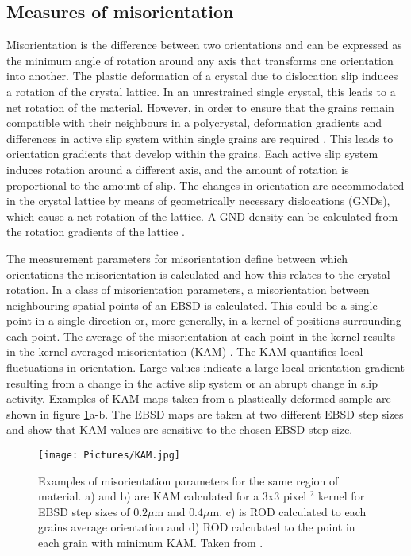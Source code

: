 \subsection{Measures of misorientation}
\label{Measures of misorientation}

Misorientation is the difference between two orientations and can be expressed as the minimum angle of rotation around any axis that transforms one orientation into another. The plastic deformation of a crystal due to dislocation slip induces a rotation of the crystal lattice. In an unrestrained single crystal, this leads to a net rotation of the material. However, in order to ensure that the grains remain compatible with their neighbours in a polycrystal, deformation gradients and differences in active slip system within single grains are required \cite{barbe2001intergranular}. This leads to orientation gradients that develop within the grains. Each active slip system induces rotation around a different axis, and the amount of rotation is proportional to the amount of slip. The changes in orientation are accommodated in the crystal lattice by means of geometrically necessary dislocations (GNDs), which cause a net rotation of the lattice. A GND density can be calculated from the rotation gradients of the lattice \cite{pantleon2008resolving}.

\noindent The measurement parameters for misorientation define between which orientations the misorientation is calculated and how this relates to the crystal rotation. In a class of misorientation parameters, a misorientation between neighbouring spatial points of an EBSD is calculated. This could be a single point in a single direction or, more generally, in a kernel of positions surrounding each point. The average of the misorientation at each point in the kernel results in the kernel-averaged misorientation (KAM) \cite{wright2011review}. The KAM quantifies local fluctuations in orientation. Large values indicate a large local orientation gradient resulting from a change in the active slip system or an abrupt change in slip activity. Examples of KAM maps taken from a plastically deformed sample are shown in figure \ref{fig:Measures of misorientation1}a-b. The EBSD maps are taken at two different EBSD step sizes and show that KAM values are sensitive to the chosen EBSD step size.

\begin{figure}
    \centering
    \texttt{[image: Pictures/KAM.jpg]}
    \caption{Examples of misorientation parameters for the same region of material. a) and b) are KAM calculated for a 3x3 pixel $^{2}$ kernel for EBSD step sizes of $0.2 \mu \mathrm{m}$ and $0.4 \mu \mathrm{m} .$ c) is ROD calculated to each grains average orientation and d) ROD calculated to the point in each grain with minimum KAM. Taken from \cite{wright2011review}.}
    \label{fig:Measures of misorientation1}
\end{figure}

